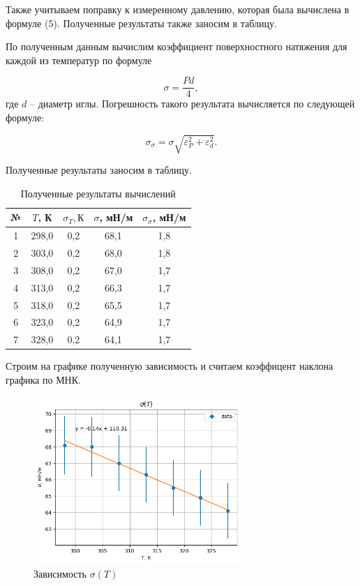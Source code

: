 \documentclass[a4paper,12pt]{article}
\begin{document}
Также учитываем поправку к измеренному давлению, которая была вычислена в формуле (5). Полученные результаты также заносим в таблицу.

По полученным данным вычислим коэффициент поверхностного натяжения для каждой из температур по формуле

\begin{equation}
	\sigma = \frac{Pd}{4},
\end{equation}
где $ d $ -- диаметр иглы. Погрешность такого результата вычисляется по следующей формуле:

\begin{equation}
	\sigma_\sigma = \sigma\sqrt{\varepsilon^2_P + \varepsilon^2_d}.
\end{equation}

Полученные результаты заносим в таблицу.

\begin{table}[H]
    \centering
    \begin{tabular}{|c|c|c|c|c|}
    \hline
        № & $ T $, К   & $ \sigma_T, К $   & $ \sigma $, мН/м & $ \sigma_\sigma $, мН/м \\ \hline
        1 & 298,0 & 0,2 & 68,1 & 1,8 \\ \hline
        2 & 303,0 & 0,2 & 68,0 & 1,8 \\ \hline
        3 & 308,0 & 0,2 & 67,0 & 1,7 \\ \hline
        4 & 313,0 & 0,2 & 66,3 & 1,7 \\ \hline
        5 & 318,0 & 0,2 & 65,5 & 1,7 \\ \hline
        6 & 323,0 & 0,2 & 64,9 & 1,7 \\ \hline
        7 & 328,0 & 0,2 & 64,1 & 1,7 \\ \hline
    \end{tabular}
    \caption{Полученные результаты вычислений}
\end{table}

Строим на графике полученную зависимость и считаем коэффицент наклона графика по МНК. 

\begin{figure}[H]
    \begin{center}
    \includegraphics[width=0.7\textwidth]{sigmaT.png}
    \end{center}
    \caption{Зависимость $\sigma (T)$}
\end{figure}
\end{document}
